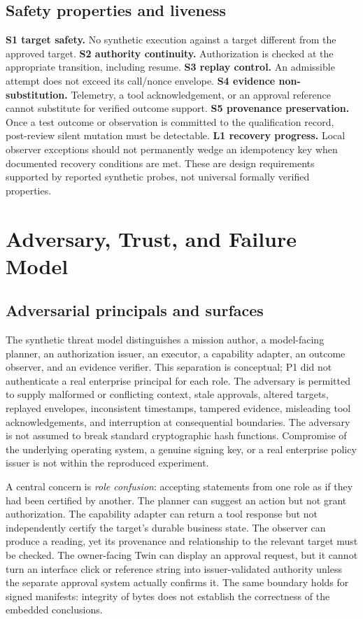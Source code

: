 \documentclass[11pt,twocolumn]{article}
\begin{document}
\subsection{Safety properties and liveness}
\textbf{S1 target safety.} No synthetic execution against a target different from the approved target. \textbf{S2 authority continuity.} Authorization is checked at the appropriate transition, including resume. \textbf{S3 replay control.} An admissible attempt does not exceed its call/nonce envelope. \textbf{S4 evidence non-substitution.} Telemetry, a tool acknowledgement, or an approval reference cannot substitute for verified outcome support. \textbf{S5 provenance preservation.} Once a test outcome or observation is committed to the qualification record, post-review silent mutation must be detectable. \textbf{L1 recovery progress.} Local observer exceptions should not permanently wedge an idempotency key when documented recovery conditions are met. These are design requirements supported by reported synthetic probes, not universal formally verified properties.

\section{Adversary, Trust, and Failure Model}
\subsection{Adversarial principals and surfaces}
The synthetic threat model distinguishes a mission author, a model-facing planner, an authorization issuer, an executor, a capability adapter, an outcome observer, and an evidence verifier. This separation is conceptual; P1 did not authenticate a real enterprise principal for each role. The adversary is permitted to supply malformed or conflicting context, stale approvals, altered targets, replayed envelopes, inconsistent timestamps, tampered evidence, misleading tool acknowledgements, and interruption at consequential boundaries. The adversary is not assumed to break standard cryptographic hash functions. Compromise of the underlying operating system, a genuine signing key, or a real enterprise policy issuer is not within the reproduced experiment.

A central concern is \emph{role confusion}: accepting statements from one role as if they had been certified by another. The planner can suggest an action but not grant authorization. The capability adapter can return a tool response but not independently certify the target's durable business state. The observer can produce a reading, yet its provenance and relationship to the relevant target must be checked. The owner-facing Twin can display an approval request, but it cannot turn an interface click or reference string into issuer-validated authority unless the separate approval system actually confirms it. The same boundary holds for signed manifests: integrity of bytes does not establish the correctness of the embedded conclusions.
\end{document}

